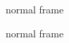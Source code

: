 \documentclass{beamer}
\begin{document}
\begin{frame} 
   normal frame 
\end{frame}

\begin{frame}
   normal frame 
\end{frame}
\end{document}
